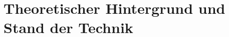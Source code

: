 %
%
%
%
%

\section{Theoretischer Hintergrund und Stand der Technik}
\label{sec:grundlagen_sota}

%
%


